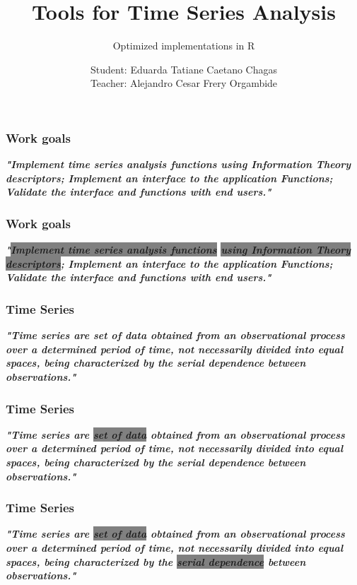 \documentclass[10pt, compress]{beamer}
\title{\LARGE Tools for Time Series Analysis}
\subtitle{Optimized implementations in R}
\author{Student: Eduarda Tatiane Caetano Chagas\\ 
Teacher: Alejandro Cesar Frery Orgambide}
\institute{LaCCAN – Laboratório de análise e computação científica}
\begin{document}
\maketitle


\begin{frame}[fragile]
\frametitle{Work goals}
\begin{sloppypar}
\textit{\textbf{\Large "Implement time series analysis functions using Information Theory descriptors; Implement an interface to the application
Functions; Validate the interface and functions with end users."}}
\end{sloppypar}
\end{frame}

\begin{frame}[fragile]
\frametitle{Work goals}
\begin{sloppypar}
\textit{\textbf{\Large "\colorbox{gray}{Implement time series analysis functions} \colorbox{gray}{using Information Theory descriptors}; Implement an interface to the application
Functions; Validate the interface and functions with end users."}}
\end{sloppypar}
\end{frame}

\begin{frame}[fragile]
\frametitle{Time Series}
\begin{sloppypar}
\textit{\textbf{\Large "Time series are set of data obtained from an observational process over a determined period of time, not necessarily divided into equal spaces, being characterized by the serial dependence between observations."}}
\end{sloppypar}
\end{frame}

\begin{frame}[fragile]
\frametitle{Time Series}
\begin{sloppypar}
\textit{\textbf{\Large "Time series are \colorbox{gray}{set of data} obtained from an observational process over a determined period of time, not necessarily divided into equal spaces, being characterized by the serial dependence between observations."}}
\end{sloppypar}
\end{frame}

\begin{frame}[fragile]
\frametitle{Time Series}
\begin{sloppypar}
\textit{\textbf{\Large "Time series are \colorbox{gray}{set of data} obtained from an observational process over a determined period of time, not necessarily divided into equal spaces, being characterized by the \colorbox{gray}{serial dependence} between observations."}}
\end{sloppypar}
\end{frame}
\end{document}
